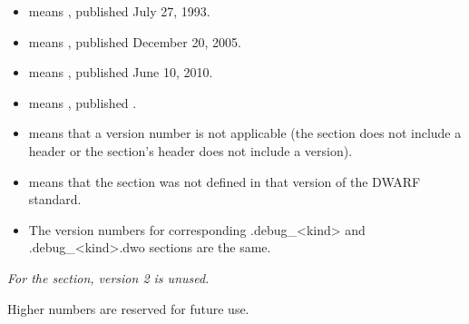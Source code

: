 \begin{itemize}
\item  {} means , published July 27, 1993.
\item  {} means , published December 20, 2005.
\item  {} means , published June 10, 2010.
\item  {} means , published 
			.
\item  \doublequote{-} means that a version number is not applicable
(the section does not include a header or the section's header does not include a version).

\item  {} means that the section was not defined in that
version of the DWARF standard.

\item  The version numbers for corresponding .debug\_<kind> and .debug\_<kind>.dwo 
sections are the same.

\end{itemize}

\textit{For the \dotdebugframe{} section, version 2 is unused.}

Higher numbers are reserved for future use.

